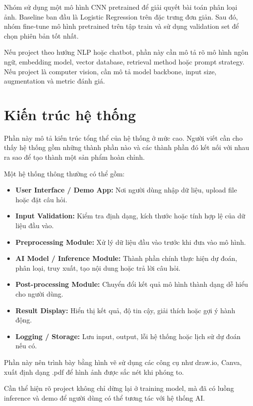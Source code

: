 \documentclass[12pt]{ai_conquer2026}
\begin{document}
\begin{aivncodebox}[Ví dụ:]
Nhóm sử dụng một mô hình CNN pretrained để giải quyết bài toán phân loại ảnh. Baseline ban đầu là Logistic Regression trên đặc trưng đơn giản. Sau đó, nhóm fine-tune mô hình pretrained trên tập train và sử dụng validation set để chọn phiên bản tốt nhất.
\end{aivncodebox}

Nếu project theo hướng NLP hoặc chatbot, phần này cần mô tả rõ mô hình ngôn ngữ, embedding model, vector database, retrieval method hoặc prompt strategy. Nếu project là computer vision, cần mô tả model backbone, input size, augmentation và metric đánh giá.

\section{Kiến trúc hệ thống}

Phần này mô tả kiến trúc tổng thể của hệ thống ở mức cao. Người viết cần cho thấy hệ thống gồm những thành phần nào và các thành phần đó kết nối với nhau ra sao để tạo thành một sản phẩm hoàn chỉnh.

Một hệ thống thông thường có thể gồm:

\begin{itemize}
\item \textbf{User Interface / Demo App:} Nơi người dùng nhập dữ liệu, upload file hoặc đặt câu hỏi.
\item \textbf{Input Validation:} Kiểm tra định dạng, kích thước hoặc tính hợp lệ của dữ liệu đầu vào.
\item \textbf{Preprocessing Module:} Xử lý dữ liệu đầu vào trước khi đưa vào mô hình.
\item \textbf{AI Model / Inference Module:} Thành phần chính thực hiện dự đoán, phân loại, truy xuất, tạo nội dung hoặc trả lời câu hỏi.
\item \textbf{Post-processing Module:} Chuyển đổi kết quả mô hình thành dạng dễ hiểu cho người dùng.
\item \textbf{Result Display:} Hiển thị kết quả, độ tin cậy, giải thích hoặc gợi ý hành động.
\item \textbf{Logging / Storage:} Lưu input, output, lỗi hệ thống hoặc lịch sử dự đoán nếu có.
\end{itemize}

Phần này nên trình bày bằng hình vẽ sử dụng các công cụ như draw.io, Canva, xuất định dạng .pdf để hình ảnh được sắc nét khi phóng to.

Cần thể hiện rõ project không chỉ dừng lại ở training model, mà đã có luồng inference và demo để người dùng có thể tương tác với hệ thống AI.
\end{document}
